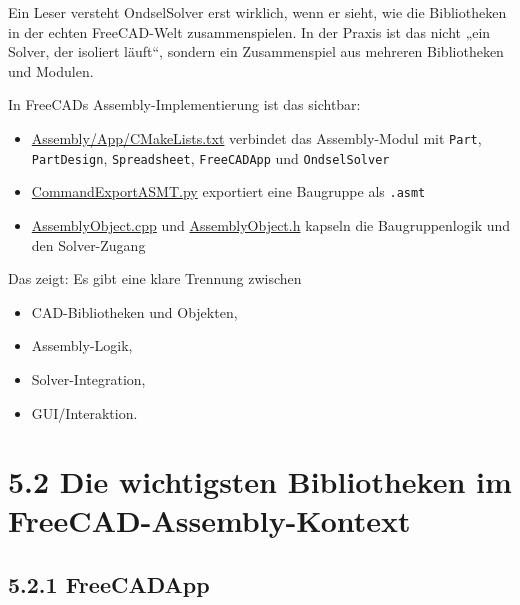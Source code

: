 \documentclass[
  12pt
]{book}
\providecommand{\tightlist}{%
  \setlength{\itemsep}{0pt}\setlength{\parskip}{0pt}}
\begin{document}
Ein Leser versteht OndselSolver erst wirklich, wenn er sieht, wie die
Bibliotheken in der echten FreeCAD-Welt zusammenspielen. In der Praxis
ist das nicht „ein Solver, der isoliert läuft``, sondern ein
Zusammenspiel aus mehreren Bibliotheken und Modulen.

In FreeCADs Assembly-Implementierung ist das sichtbar:

\begin{itemize}
\tightlist
\item
  \href{https://github.com/FreeCAD/FreeCAD/blob/main/src/Mod/Assembly/App/CMakeLists.txt}{Assembly/App/CMakeLists.txt}
  verbindet das Assembly-Modul mit \texttt{Part}, \texttt{PartDesign},
  \texttt{Spreadsheet}, \texttt{FreeCADApp} und \texttt{OndselSolver}
\item
  \href{https://github.com/FreeCAD/FreeCAD/blob/main/src/Mod/Assembly/CommandExportASMT.py}{CommandExportASMT.py}
  exportiert eine Baugruppe als \texttt{.asmt}
\item
  \href{https://github.com/FreeCAD/FreeCAD/blob/main/src/Mod/Assembly/App/AssemblyObject.cpp}{AssemblyObject.cpp}
  und
  \href{https://github.com/FreeCAD/FreeCAD/blob/main/src/Mod/Assembly/App/AssemblyObject.h}{AssemblyObject.h}
  kapseln die Baugruppenlogik und den Solver-Zugang
\end{itemize}

Das zeigt: Es gibt eine klare Trennung zwischen

\begin{itemize}
\tightlist
\item
  CAD-Bibliotheken und Objekten,
\item
  Assembly-Logik,
\item
  Solver-Integration,
\item
  GUI/Interaktion.
\end{itemize}

\hypertarget{die-wichtigsten-bibliotheken-im-freecad-assembly-kontext}{%
\section{\texorpdfstring{{5.2} Die wichtigsten Bibliotheken im
FreeCAD-Assembly-Kontext}{5.2 Die wichtigsten Bibliotheken im FreeCAD-Assembly-Kontext}}\label{die-wichtigsten-bibliotheken-im-freecad-assembly-kontext}}

\hypertarget{freecadapp}{%
\subsection{\texorpdfstring{{5.2.1}
FreeCADApp}{5.2.1 FreeCADApp}}\label{freecadapp}}
\end{document}
